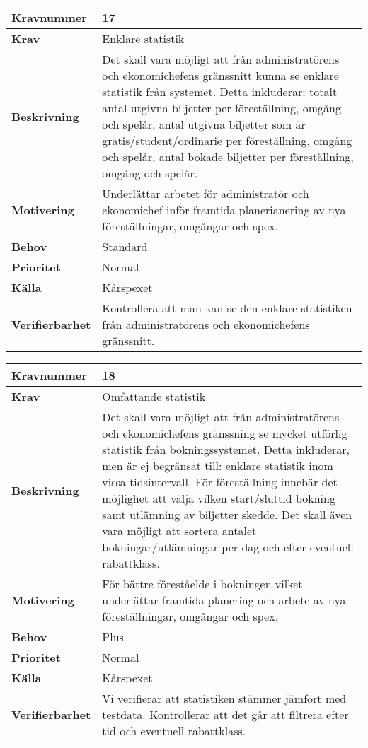 \documentclass[a4paper, twoside, 11pt, titlepage]{article}
\begin{document}
\begin{tabular} { | p{3cm} | p{12.2cm} | }
	\hline
	\textbf{Kravnummer} & 17  \\
	\hline
	\textbf{Krav} & Enklare statistik   \\
	\hline
	\textbf{Beskrivning} & Det skall vara möjligt att från administratörens och ekonomichefens gränssnitt kunna se enklare statistik från systemet. Detta inkluderar: totalt antal utgivna biljetter per föreställning, omgång och spelår, antal utgivna biljetter som är gratis/student/ordinarie per föreställning, omgång och spelår, antal bokade biljetter per föreställning, omgång och spelår.   \\
	\hline
	\textbf{Motivering} & Underlättar arbetet för administratör och ekonomichef inför framtida planerianering av nya föreställningar, omgångar och spex.  \\
	\hline
	\textbf{Behov} & Standard  \\
	\hline
	\textbf{Prioritet} & Normal  \\
	\hline
	\textbf{Källa} & Kårspexet  \\
	\hline
	\textbf{Verifierbarhet} & Kontrollera att man kan se den enklare statistiken från administratörens och ekonomichefens gränssnitt.  \\
	\hline
\end{tabular}

\begin{tabular} { | p{3cm} | p{12.2cm} | }
	\hline
	\textbf{Kravnummer} & 18  \\
	\hline
	\textbf{Krav} & Omfattande statistik  \\
	\hline
	\textbf{Beskrivning} & Det skall vara möjligt att från administratörens och ekonomichefens gränssning se mycket utförlig statistik från bokningssystemet. Detta inkluderar, men är ej begränsat till: enklare statistik inom vissa tidsintervall. För föreställning innebär det möjlighet att välja vilken start/sluttid bokning samt utlämning av biljetter skedde. Det skall även vara möjligt att sortera antalet bokningar/utlämningar per dag och efter eventuell rabattklass.  \\
	\hline
	\textbf{Motivering} & För bättre föreståelde i bokningen vilket underlättar framtida planering och arbete av nya föreställningar, omgångar och spex.  \\
	\hline
	\textbf{Behov} & Plus  \\
	\hline
	\textbf{Prioritet} & Normal  \\
	\hline
	\textbf{Källa} & Kårspexet  \\
	\hline
	\textbf{Verifierbarhet} & Vi verifierar att statistiken stämmer jämfört med testdata. Kontrollerar att det går att filtrera efter tid och eventuell rabattklass.  \\
	\hline
\end{tabular}
\end{document}
